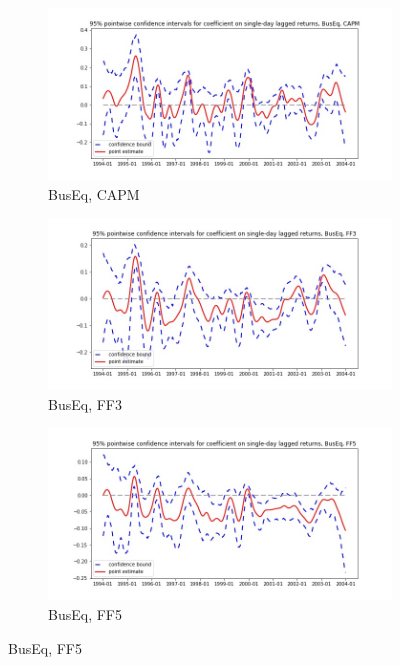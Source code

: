 \documentclass{article}
\begin{document}
  \begin{figure}
  \centering
  \begin{subfigure}[b]{0.3\textwidth}
    \centering
    \includegraphics[width=\textwidth]{BusEq/pointwiseCIs_CAPM.jpg}
    \caption{BusEq, CAPM}
    \label{fig:1}
  \end{subfigure}
  \begin{subfigure}[b]{0.3\textwidth}
    \centering
    \includegraphics[width=\textwidth]{BusEq/pointwiseCIs_FF3.jpg}
    \caption{BusEq, FF3}
    \label{fig:2}
  \end{subfigure}
    \begin{subfigure}[b]{0.3\textwidth}
    \centering
    \includegraphics[width=\textwidth]{BusEq/pointwiseCIs_FF5.jpg}
    \caption{BusEq, FF5}
    \label{fig:1}
  \end{subfigure}
  \end{figure}
  
\end{document}
